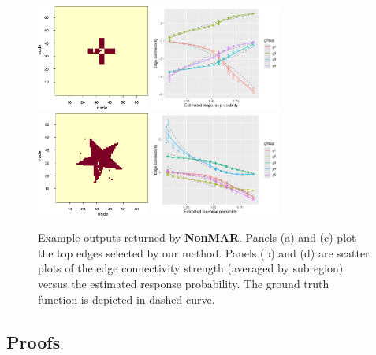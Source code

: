 \documentclass[11pt]{article}
\theoremstyle{plain}
\theoremstyle{definition}
\begin{document}
\begin{figure}[ht]
    \centering
   \includegraphics[width=3.7cm]{est_cross.pdf}
      \includegraphics[width=4.3cm]{FMD_cross.pdf}
          \includegraphics[width=3.7cm]{est_star.pdf}
               \includegraphics[width=4.3cm]{FMD_star.pdf}
 \caption{Example outputs returned by {\bf \small NonMAR}. Panels (a) and (c) plot the top edges selected by our method. Panels (b) and (d) are scatter plots of the edge connectivity strength (averaged by subregion) versus the estimated response probability. The ground truth function is depicted in dashed curve.}\label{fig:compare3}
\end{figure}


\clearpage
\subsection{Proofs}
\end{document}
